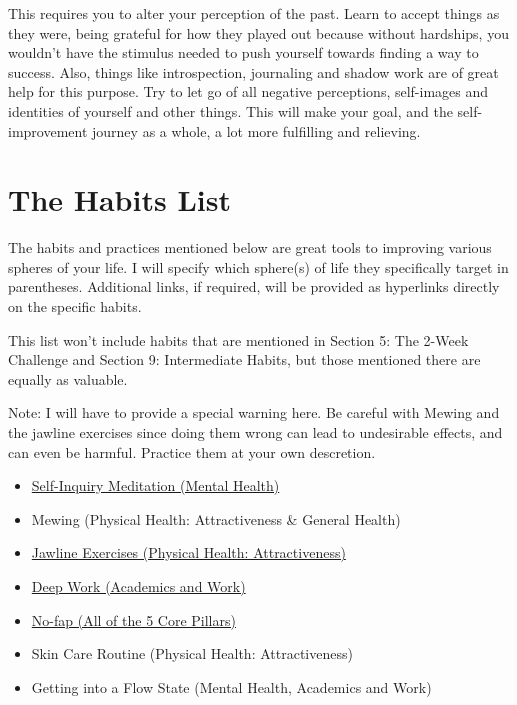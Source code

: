 \documentclass[
]{book}
\providecommand{\tightlist}{%
  \setlength{\itemsep}{0pt}\setlength{\parskip}{0pt}}
\begin{document}
This requires you to alter your perception of the past. Learn to accept things as they were, being grateful for how they played out because without hardships, you wouldn't have the stimulus needed to push yourself towards finding a way to success. Also, things like introspection, journaling and shadow work are of great help for this purpose. Try to let go of all negative perceptions, self-images and identities of yourself and other things. This will make your goal, and the self-improvement journey as a whole, a lot more fulfilling and relieving.

\hypertarget{the-habits-list}{%
\section{The Habits List}\label{the-habits-list}}

The habits and practices mentioned below are great tools to improving various spheres of your life. I will specify which sphere(s) of life they specifically target in parentheses. Additional links, if required, will be provided as hyperlinks directly on the specific habits.

This list won't include habits that are mentioned in Section 5: The 2-Week Challenge and Section 9: Intermediate Habits, but those mentioned there are equally as valuable.

Note: I will have to provide a special warning here. Be careful with Mewing and the jawline exercises since doing them wrong can lead to undesirable effects, and can even be harmful. Practice them at your own descretion.

\begin{itemize}
\tightlist
\item
  \href{https://www.youtube.com/@awakenwithsunny/videos}{Self-Inquiry Meditation (Mental Health)}
\item
  Mewing (Physical Health: Attractiveness \& General Health)
\item
  \href{https://www.youtube.com/watch?v=mqphY24Tnp0}{Jawline Exercises (Physical Health: Attractiveness)}
\item
  \href{https://www.amazon.com/Deep-Work-Focused-Success-Distracted/dp/1455586692}{Deep Work (Academics and Work)}
\item
  \href{https://easypeasymethod.org}{No-fap (All of the 5 Core Pillars)}
\item
  Skin Care Routine (Physical Health: Attractiveness)
\item
  Getting into a Flow State (Mental Health, Academics and Work)
\end{itemize}
\end{document}
